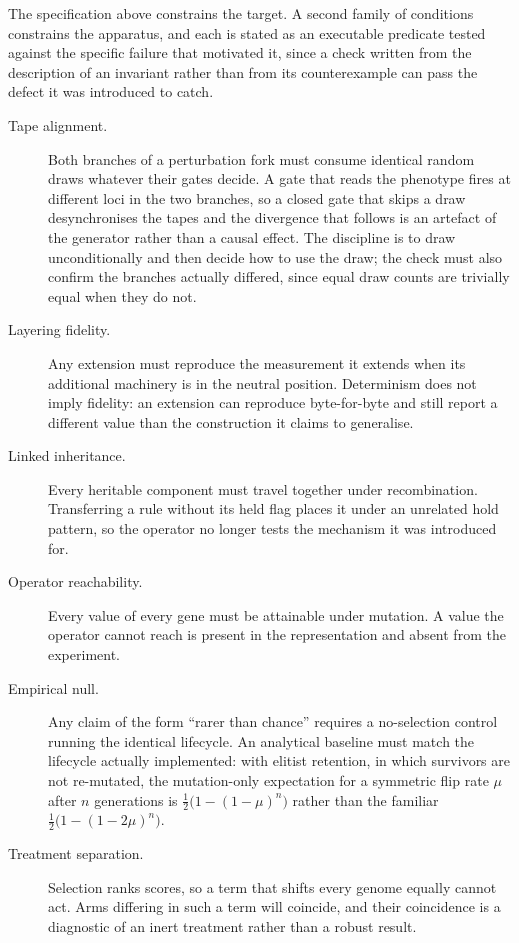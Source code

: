 \documentclass[man,12pt,floatsintext,donotrepeattitle]{apa7}
\begin{document}
The specification above constrains the target. A second family of conditions
constrains the apparatus, and each is stated as an executable predicate tested
against the specific failure that motivated it, since a check written from the
description of an invariant rather than from its counterexample can pass the defect
it was introduced to catch.

\begin{description}
\item[Tape alignment.] Both branches of a perturbation fork must consume identical
  random draws whatever their gates decide. A gate that reads the phenotype fires at
  different loci in the two branches, so a closed gate that skips a draw
  desynchronises the tapes and the divergence that follows is an artefact of the
  generator rather than a causal effect. The discipline is to draw unconditionally and
  then decide how to use the draw; the check must also confirm the branches actually
  differed, since equal draw counts are trivially equal when they do not.
\item[Layering fidelity.] Any extension must reproduce the measurement it extends
  when its additional machinery is in the neutral position. Determinism does not imply
  fidelity: an extension can reproduce byte-for-byte and still report a different value
  than the construction it claims to generalise.
\item[Linked inheritance.] Every heritable component must travel together under
  recombination. Transferring a rule without its held flag places it under an
  unrelated hold pattern, so the operator no longer tests the mechanism it was
  introduced for.
\item[Operator reachability.] Every value of every gene must be attainable under
  mutation. A value the operator cannot reach is present in the representation and
  absent from the experiment.
\item[Empirical null.] Any claim of the form ``rarer than chance'' requires a
  no-selection control running the identical lifecycle. An analytical baseline must
  match the lifecycle actually implemented: with elitist retention, in which survivors
  are not re-mutated, the mutation-only expectation for a symmetric flip rate $\mu$
  after $n$ generations is $\tfrac{1}{2}\bigl(1 - (1-\mu)^n\bigr)$ rather than the
  familiar $\tfrac{1}{2}\bigl(1 - (1-2\mu)^n\bigr)$.
\item[Treatment separation.] Selection ranks scores, so a term that shifts every
  genome equally cannot act. Arms differing in such a term will coincide, and their
  coincidence is a diagnostic of an inert treatment rather than a robust result.
\end{description}
\end{document}
